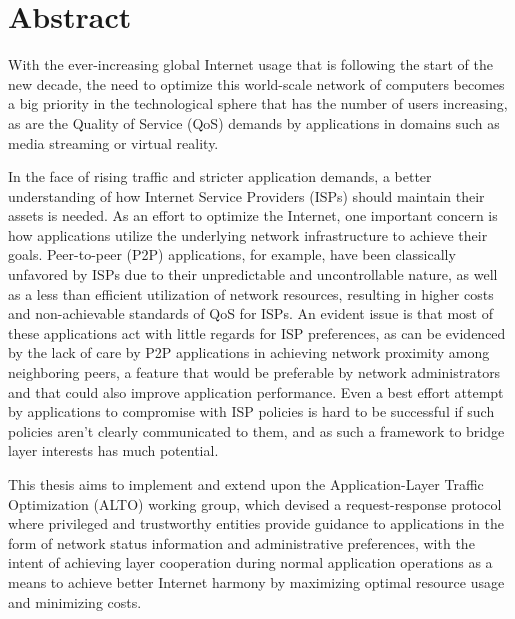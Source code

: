 \chapter*{Abstract}

    With the ever-increasing global Internet usage that is following the start of the new decade, the need to optimize this world-scale network of computers becomes a big priority in the technological sphere that has the number of users increasing, as are the Quality of Service (QoS) demands by applications in domains such as media streaming or virtual reality.

    In the face of rising traffic and stricter application demands, a better understanding of how Internet Service Providers (ISPs) should maintain their assets is needed.
    As an effort to optimize the Internet, one important concern is how applications utilize the underlying network infrastructure to achieve their goals.
    Peer-to-peer (P2P) applications, for example, have been classically unfavored by ISPs due to their unpredictable and uncontrollable nature, as well as a less than efficient utilization of network resources, resulting in higher costs and non-achievable standards of QoS for ISPs.
    An evident issue is that most of these applications act with little regards for ISP preferences, as can be evidenced by the lack of care by P2P applications in achieving network proximity among neighboring peers, a feature that would be preferable by network administrators and that could also improve application performance.
    Even a best effort attempt by applications to compromise with ISP policies is hard to be successful if such policies aren't clearly communicated to them, and as such a framework to bridge layer interests has much potential.

    This thesis aims to implement and extend upon the Application-Layer Traffic Optimization (ALTO) working group, which devised a request-response protocol where privileged and trustworthy entities provide guidance to applications in the form of network status information and administrative preferences, with the intent of achieving layer cooperation during normal application operations as a means to achieve better Internet harmony by maximizing optimal resource usage and minimizing costs.

